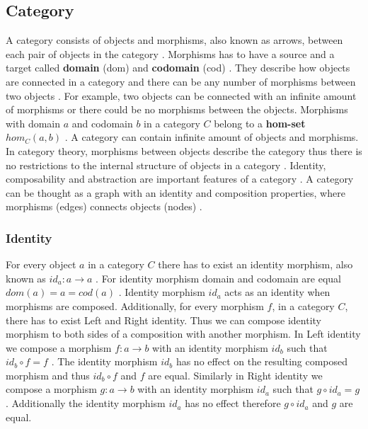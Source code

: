 \documentclass[article]{aaltoseries}
\begin{document}

  \subsection{Category}
  A category consists of objects and morphisms, also known as arrows, between
  each pair of objects in the category \cite{barr1990category,
    mac2013categories}. Morphisms has to have a source and a target called
  \textbf{domain} (dom) and \textbf{codomain} (cod) \cite{awodey2006category,
    barr1990category, mac2013categories}. They describe how objects are
  connected in a category and there can be any number of morphisms between two
  objects \cite{barr1990category, computational}. For example, two objects can
  be connected with an infinite amount of morphisms or there could be no morphisms
  between the objects. Morphisms with domain $a$ and codomain $b$ in a category
  $C$ belong to a \textbf{hom-set} $hom_C(a, b)$ \cite{barr1990category,
    mac2013categories}. A category can contain infinite amount of objects and
  morphisms. In category theory, morphisms between objects describe the category
  thus there is no restrictions to the internal structure of objects in a
  category \cite{computational}. Identity, composability and abstraction
  are important features of a category \cite{awodey2006category,
    barr1990category}. A category can be thought as a graph with an identity
  and composition properties, where morphisms (edges) connects objects (nodes)
  \cite{barr1990category}.


  \subsubsection{Identity}
    For every object $a$ in a category $C$ there has to exist an identity
    morphism, also known as $id_a: a \rightarrow a$ \cite{mac2013categories,
      computational}. For identity morphism domain and codomain are equal $dom(a)
    = a = cod(a)$ \cite{mac2013categories}. Identity morphism $id_a$ acts as an
    identity when morphisms are composed. Additionally, for every morphism $f$,
    in a category $C$, there has to exist Left and Right identity. Thus we can
    compose identity morphism to both sides of a composition with another
    morphism. In Left identity we compose a morphism $f: a \rightarrow b$ with
    an identity morphism $id_b$ such that $id_b \circ f = f$
    \cite{barr1990category, computational}. The identity morphism $id_b$ has no
    effect on the resulting composed morphism and thus $id_b \circ f$ and $f$
    are equal. Similarly in Right identity we compose a morphism $g: a
    \rightarrow b$ with an identity morphism $id_a$ such that $g \circ id_a = g$
    \cite{barr1990category, computational}. Additionally the identity morphism
    $id_a$ has no effect therefore $g \circ id_a$ and $g$ are equal.
 
\end{document}
